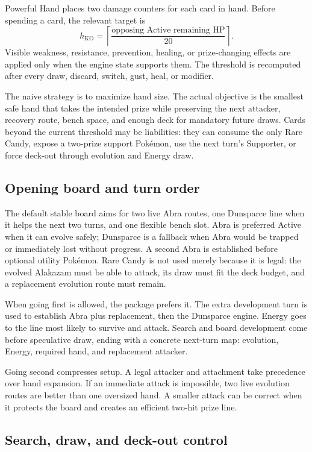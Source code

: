 \documentclass[10pt]{article}
\begin{document}
Powerful Hand places two damage counters for each card in hand. Before spending a card, the relevant target is
\[
h_{\mathrm{KO}}=\left\lceil\frac{\text{opposing Active remaining HP}}{20}\right\rceil.
\]
Visible weakness, resistance, prevention, healing, or prize-changing effects are applied only when the engine state supports them. The threshold is recomputed after every draw, discard, switch, gust, heal, or modifier.

The naive strategy is to maximize hand size. The actual objective is the smallest safe hand that takes the intended prize while preserving the next attacker, recovery route, bench space, and enough deck for mandatory future draws. Cards beyond the current threshold may be liabilities: they can consume the only Rare Candy, expose a two-prize support Pok\'emon, use the next turn's Supporter, or force deck-out through evolution and Energy draw.

\subsection{Opening board and turn order}

The default stable board aims for two live Abra routes, one Dunsparce line when it helps the next two turns, and one flexible bench slot. Abra is preferred Active when it can evolve safely; Dunsparce is a fallback when Abra would be trapped or immediately lost without progress. A second Abra is established before optional utility Pok\'emon. Rare Candy is not used merely because it is legal: the evolved Alakazam must be able to attack, its draw must fit the deck budget, and a replacement evolution route must remain.

When going first is allowed, the package prefers it. The extra development turn is used to establish Abra plus replacement, then the Dunsparce engine. Energy goes to the line most likely to survive and attack. Search and board development come before speculative draw, ending with a concrete next-turn map: evolution, Energy, required hand, and replacement attacker.

Going second compresses setup. A legal attacker and attachment take precedence over hand expansion. If an immediate attack is impossible, two live evolution routes are better than one oversized hand. A smaller attack can be correct when it protects the board and creates an efficient two-hit prize line.

\subsection{Search, draw, and deck-out control}
\end{document}
